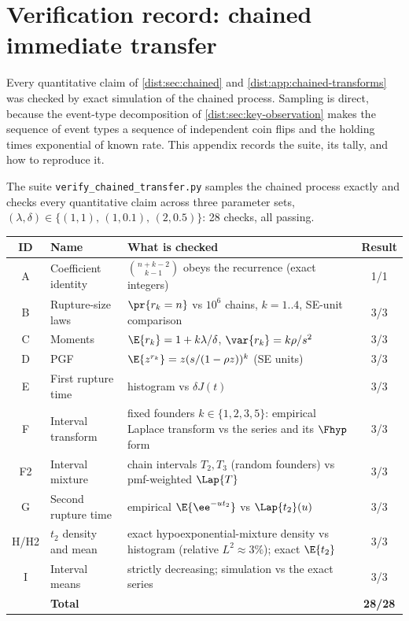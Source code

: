 \section{Verification record: chained immediate transfer}
\label{dist:app:verification}

Every quantitative claim of \cref{dist:sec:chained} and
\cref{dist:app:chained-transforms} was checked by exact simulation of the
chained process. Sampling is direct, because the event-type decomposition of
\cref{dist:sec:key-observation} makes the sequence of event types a sequence
of independent coin flips and the holding times exponential of known rate.
This appendix records the suite, its tally, and how to reproduce it.

The suite \texttt{verify\_chained\_transfer.py} samples the chained process
exactly and checks every quantitative claim across three parameter sets,
$(\lambda,\delta)\in\{(1,1),\,(1,0.1),\,(2,0.5)\}$: 28 checks, all passing.

\begin{center}
\renewcommand{\arraystretch}{1.05}
\footnotesize
\begin{tabular}{@{}clp{}c@{}}
\toprule
ID & Name & What is checked & Result \\
\midrule
A & Coefficient identity &
  $\binom{n+k-2}{k-1}$ obeys the recurrence (exact integers) & 1/1 \\
B & Rupture-size laws &
  $\pr{r_k=n}$ vs $10^6$ chains, $k=1..4$, SE-unit comparison & 3/3 \\
C & Moments & $\E{r_k}=1+k\lambda/\delta$, $\var{r_k}=k\rho/s^2$ & 3/3 \\
D & PGF & $\E{z^{r_k}}=z(s/(1-\rho z))^k$ (SE units) & 3/3 \\
E & First rupture time & histogram vs $\delta J(t)$ & 3/3 \\
F & Interval transform &
  fixed founders $k\in\{1,2,3,5\}$: empirical Laplace transform vs the
  series and its $\Fhyp$ form & 3/3 \\
F2 & Interval mixture &
  chain intervals $T_2,T_3$ (random founders) vs pmf-weighted $\Lap{T}$ & 3/3 \\
G & Second rupture time & empirical $\E{\ee^{-ut_2}}$ vs $\Lap{t_2}(u)$ & 3/3 \\
H/H2 & $t_2$ density and mean &
  exact hypoexponential-mixture density vs histogram
  (relative $L^2\approx3\%$); exact $\E{t_2}$ & 3/3 \\
I & Interval means &
  strictly decreasing; simulation vs the exact series & 3/3 \\
\midrule
 & \textbf{Total} & & \textbf{28/28} \\
\bottomrule
\end{tabular}
\end{center}

